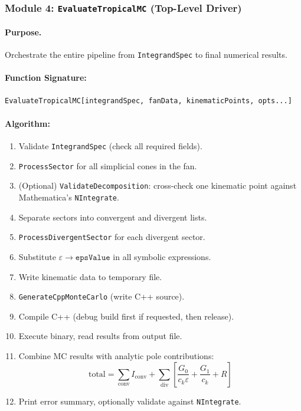 \documentclass[11pt,a4paper]{article}
\begin{document}
\subsubsection{Module 4: \texttt{EvaluateTropicalMC} (Top-Level Driver)}

\paragraph{Purpose.} Orchestrate the entire pipeline from \texttt{IntegrandSpec} to final numerical results.

\paragraph{Function Signature:}
\begin{lstlisting}
EvaluateTropicalMC[integrandSpec, fanData, kinematicPoints, opts...]
\end{lstlisting}

\paragraph{Algorithm:}
\begin{enumerate}
  \item Validate \texttt{IntegrandSpec} (check all required fields).
  \item \texttt{ProcessSector} for all simplicial cones in the fan.
  \item (Optional) \texttt{ValidateDecomposition}: cross-check one kinematic point against Mathematica's \texttt{NIntegrate}.
  \item Separate sectors into convergent and divergent lists.
  \item \texttt{ProcessDivergentSector} for each divergent sector.
  \item Substitute $\varepsilon \to \texttt{epsValue}$ in all symbolic expressions.
  \item Write kinematic data to temporary file.
  \item \texttt{GenerateCppMonteCarlo} (write C++ source).
  \item Compile C++ (debug build first if requested, then release).
  \item Execute binary, read results from output file.
  \item Combine MC results with analytic pole contributions:
    \begin{equation}
    \mathrm{total} = \sum_{\mathrm{conv}} I_{\mathrm{conv}} + \sum_{\mathrm{div}} \left[\frac{G_0}{c_k \varepsilon} + \frac{G_1}{c_k} + R\right]
    \end{equation}
  \item Print error summary, optionally validate against \texttt{NIntegrate}.
\end{enumerate}
\end{document}
